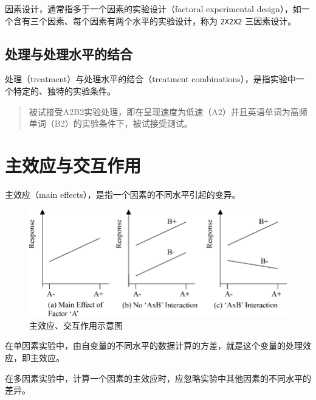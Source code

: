 \documentclass[]{ctexbook}
\begin{document}
因素设计，通常指多于一个因素的实验设计（factoral experimental design），如一个含有三个因素、每个因素有两个水平的实验设计，称为 \texttt{2X2X2} 三因素设计。

\hypertarget{ux5904ux7406ux4e0eux5904ux7406ux6c34ux5e73ux7684ux7ed3ux5408}{%
\subsection{处理与处理水平的结合}\label{ux5904ux7406ux4e0eux5904ux7406ux6c34ux5e73ux7684ux7ed3ux5408}}

处理（treatment）与处理水平的结合（treatment combinations），是指实验中一个特定的、独特的实验条件。

\begin{quote}
被试接受A2B2实验处理，即在呈现速度为低速（A2）并且英语单词为高频单词（B2）的实验条件下，被试接受测试。
\end{quote}

\hypertarget{ux4e3bux6548ux5e94ux4e0eux4ea4ux4e92ux4f5cux7528}{%
\section{主效应与交互作用}\label{ux4e3bux6548ux5e94ux4e0eux4ea4ux4e92ux4f5cux7528}}

主效应（main effects），是指一个因素的不同水平引起的变异。

\begin{figure}

{\centering \includegraphics[width=0.9\linewidth]{images/Main-and-interaction-effects} 

}

\caption{主效应、交互作用示意图}\label{fig:maineffect}
\end{figure}

在单因素实验中，由自变量的不同水平的数据计算的方差，就是这个变量的处理效应，即主效应。

在多因素实验中，计算一个因素的主效应时，应忽略实验中其他因素的不同水平的差异。
\end{document}
